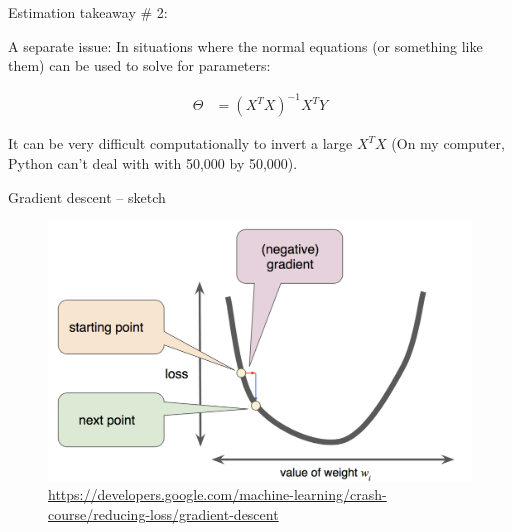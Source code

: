 \documentclass[aspectratio=169, handout]{beamer}
\begin{document}
\begin{frame}{Estimation takeaway \# 2: }

A separate issue: In situations where the normal equations (or something like them) can be used to solve for parameters:

\begin{align*}
\Theta &=  
(X^TX)^{-1}X^TY
\end{align*}

It can be very difficult computationally to invert a large $X^TX$ (On my computer, Python can't deal with with 50,000 by 50,000).  
\end{frame}



\begin{frame}{Gradient descent -- sketch}

\pause
\begin{figure}
\includegraphics[height=0.7\textheight]{grad_desc_google_4}
\caption*{\url{https://developers.google.com/machine-learning/crash-course/reducing-loss/gradient-descent}}
\end{figure}

\end{frame}
\end{document}
